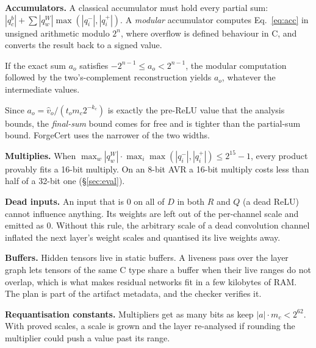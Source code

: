 \textbf{Accumulators.} A classical accumulator must hold every partial sum: $|q^b_c|+\sum|q^W_w|\max(|q^-_i|,|q^+_i|)$. A \emph{modular} accumulator computes Eq.~\eqref{eq:acc} in unsigned arithmetic modulo $2^n$, where overflow is defined behaviour in C, and converts the result back to a signed value.
\begin{lemma}\label{lem:modular}
If the exact sum $a_o$ satisfies $-2^{n-1}\le a_o<2^{n-1}$, the modular computation followed by the two's-complement reconstruction yields $a_o$, whatever the intermediate values.
\end{lemma}
\noindent Since $a_o=\hat v_o/(t_om_c2^{-k_c})$ is exactly the pre-ReLU value that the analysis bounds, the \emph{final-sum} bound comes for free and is tighter than the partial-sum bound. ForgeCert uses the narrower of the two widths.

\textbf{Multiplies.} When $\max_w|q^W_w|\cdot\max_i\max(|q^-_i|,|q^+_i|)\le 2^{15}-1$, every product provably fits a 16-bit multiply. On an 8-bit AVR a 16-bit multiply costs less than half of a 32-bit one (\S\ref{sec:eval}).

\textbf{Dead inputs.} An input that is $0$ on all of $D$ in both $R$ and $Q$ (a dead ReLU) cannot influence anything. Its weights are left out of the per-channel scale and emitted as $0$. Without this rule, the arbitrary scale of a dead convolution channel inflated the next layer's weight scales and quantised its live weights away.

\textbf{Buffers.} Hidden tensors live in static buffers. A liveness pass over the layer graph lets tensors of the same C type share a buffer when their live ranges do not overlap, which is what makes residual networks fit in a few kilobytes of RAM. The plan is part of the artifact metadata, and the checker verifies it.

\textbf{Requantisation constants.} Multipliers get as many bits as keep $|a|\cdot m_c<2^{62}$. With proved scales, a scale is grown and the layer re-analysed if rounding the multiplier could push a value past its range.

